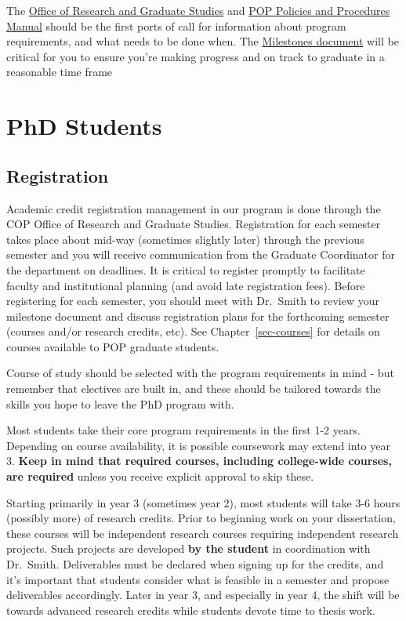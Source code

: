 \documentclass[
  letterpaper,
  DIV=11,
  numbers=noendperiod]{scrreprt}
\begin{document}
The
\href{https://pharmacy.ufl.edu/research/research-and-graduate-studies/}{Office
of Research and Graduate Studies} and
\href{https://pop.pharmacy.ufl.edu/education/resources-links/}{POP
Policies and Procedures Manual} should be the first ports of call for
information about program requirements, and what needs to be done when.
The
\href{https://pop.pharmacy.ufl.edu/people/students/forms-and-templates/}{Milestones
document} will be critical for you to ensure you're making progress and
on track to graduate in a reasonable time frame

\hypertarget{phd-students}{%
\section{PhD Students}\label{phd-students}}

\hypertarget{registration}{%
\subsection{Registration}\label{registration}}

Academic credit registration management in our program is done through
the COP Office of Research and Graduate Studies. Registration for each
semester takes place about mid-way (sometimes slightly later) through
the previous semester and you will receive communication from the
Graduate Coordinator for the department on deadlines. It is critical to
register promptly to facilitate faculty and institutional planning (and
avoid late registration fees). Before registering for each semester, you
should meet with Dr.~Smith to review your milestone document and discuss
registration plans for the forthcoming semester (courses and/or research
credits, etc). See Chapter~\ref{sec-courses} for details on courses
available to POP graduate students.

Course of study should be selected with the program requirements in mind
- but remember that electives are built in, and these should be tailored
towards the skills you hope to leave the PhD program with.

Most students take their core program requirements in the first 1-2
years. Depending on course availability, it is possible coursework may
extend into year 3. \textbf{Keep in mind that required courses,
including college-wide courses, are required} unless you receive
explicit approval to skip these.

Starting primarily in year 3 (sometimes year 2), most students will take
3-6 hours (possibly more) of research credits. Prior to beginning work
on your dissertation, these courses will be independent research courses
requiring independent research projects. Such projects are developed
\textbf{by the student} in coordination with Dr.~Smith. Deliverables
must be declared when signing up for the credits, and it's important
that students consider what is feasible in a semester and propose
deliverables accordingly. Later in year 3, and especially in year 4, the
shift will be towards advanced research credits while students devote
time to thesis work.
\end{document}
